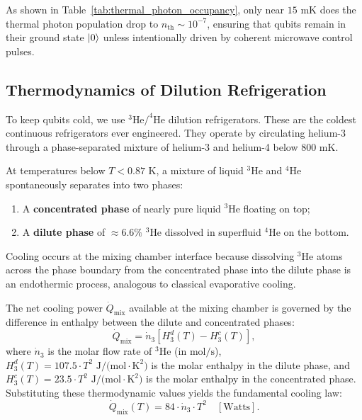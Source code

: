 As shown in Table~\ref{tab:thermal_photon_occupancy}, only near $15\text{ mK}$ does the thermal photon population drop to $n_{\text{th}} \sim 10^{-7}$, ensuring that qubits remain in their ground state $\ket{0}$ unless intentionally driven by coherent microwave control pulses.

\subsection{Thermodynamics of Dilution Refrigeration}

To keep qubits cold, we use $^3\text{He}/^4\text{He}$ dilution refrigerators. These are the coldest continuous refrigerators ever engineered. They operate by circulating helium-3 through a phase-separated mixture of helium-3 and helium-4 below $800\text{ mK}$. 

At temperatures below $T < 0.87\text{ K}$, a mixture of liquid $^3\text{He}$ and $^4\text{He}$ spontaneously separates into two phases:
\begin{enumerate}
    \item A \textbf{concentrated phase} of nearly pure liquid $^3\text{He}$ floating on top;
    \item A \textbf{dilute phase} of $\approx 6.6\%$ $^3\text{He}$ dissolved in superfluid $^4\text{He}$ on the bottom.
\end{enumerate}

Cooling occurs at the mixing chamber interface because dissolving $^3\text{He}$ atoms across the phase boundary from the concentrated phase into the dilute phase is an endothermic process, analogous to classical evaporative cooling.

The net cooling power $\dot{Q}_{\text{mix}}$ available at the mixing chamber is governed by the difference in enthalpy between the dilute and concentrated phases:
\begin{equation}
    \dot{Q}_{\text{mix}} = \dot{n}_3 \left[ H_3^d(T) - H_3^c(T) \right],
    \label{eq:dilution_cooling_enthalpy}
\end{equation}
where $\dot{n}_3$ is the molar flow rate of $^3\text{He}$ (in $\text{mol/s}$), $H_3^d(T) = 107.5 \cdot T^2\text{ J/(mol}\cdot\text{K}^2)$ is the molar enthalpy in the dilute phase, and $H_3^c(T) = 23.5 \cdot T^2\text{ J/(mol}\cdot\text{K}^2)$ is the molar enthalpy in the concentrated phase. Substituting these thermodynamic values yields the fundamental cooling law:
\begin{equation}
    \dot{Q}_{\text{mix}}(T) = 84 \cdot \dot{n}_3 \cdot T^2 \quad [\text{Watts}].
    \label{eq:dilution_cooling_quadratic}
\end{equation}

